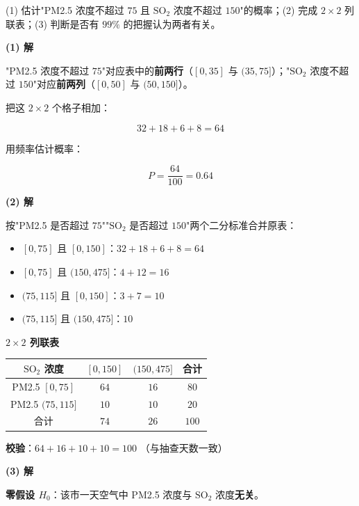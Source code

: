 \begin{answer}
  (1) 估计"PM2.5 浓度不超过 $75$ 且 $\mathrm{SO_2}$ 浓度不超过 $150$"的概率；(2) 完成 $2\times2$ 列联表；(3) 判断是否有 $99\%$ 的把握认为两者有关。

\par\medskip

\textbf{(1) 解}

"PM2.5 浓度不超过 $75$"对应表中的\textbf{前两行}（$[0,35]$ 与 $(35,75]$）；"$\mathrm{SO_2}$ 浓度不超过 $150$"对应\textbf{前两列}（$[0,50]$ 与 $(50,150]$）。

把这 $2\times2$ 个格子相加：

\nopagebreak[4]
\[32+18+6+8=64\]

用频率估计概率：

\nopagebreak[4]
\[P=\frac{64}{100}=0.64\]

\par\medskip

\textbf{(2) 解}

按"PM2.5 是否超过 $75$""$\mathrm{SO_2}$ 是否超过 $150$"两个二分标准合并原表：

\begin{itemize}
\item $[0,75]$ 且 $[0,150]$：$32+18+6+8=64$
\item $[0,75]$ 且 $(150,475]$：$4+12=16$
\item $(75,115]$ 且 $[0,150]$：$3+7=10$
\item $(75,115]$ 且 $(150,475]$：$10$
\end{itemize}

\textbf{$2\times2$ 列联表}

\begin{center}
\begin{tabular}{cccc}
\toprule
$\mathrm{SO_2}$ 浓度 & $[0,150]$ & $(150,475]$ & 合计 \\
\midrule
PM2.5 $[0,75]$ & $64$ & $16$ & $80$ \\
PM2.5 $(75,115]$ & $10$ & $10$ & $20$ \\
合计 & $74$ & $26$ & $100$ \\
\bottomrule
\end{tabular}
\end{center}

\textbf{校验}：$64+16+10+10=100$ （与抽查天数一致）

\par\medskip

\textbf{(3) 解}

\textbf{零假设 $H_0$}：该市一天空气中 PM2.5 浓度与 $\mathrm{SO_2}$ 浓度\textbf{无关}。


\end{answer}
